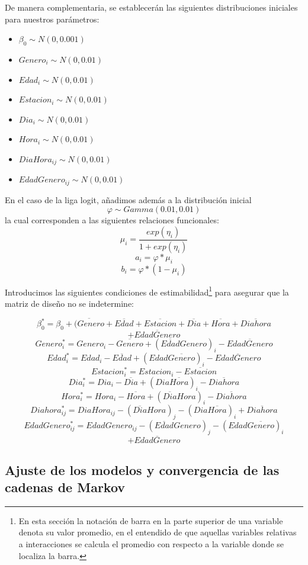 \documentclass[9pt,twocolumn,twoside]{ilcss}
\begin{document}
De manera complementaria, se establecerán las siguientes distribuciones iniciales para nuestros parámetros:
\begin{itemize}
	\item $\beta_0 \sim N(0,0.001)$
	\item $Genero_i \sim N(0,0.01)$
	\item $Edad_i \sim N(0,0.01)$
	\item $Estacion_i \sim N(0,0.01)$
	\item $Dia_i \sim N(0,0.01)$
	\item $Hora_i \sim N(0,0.01)$
	\item $DiaHora_{ij} \sim N(0,0.01)$
	\item $EdadGenero_{ij} \sim N(0,0.01)$
	
\end{itemize}
En el caso de la liga logit, añadimos además a la distribución inicial
$$\varphi \sim Gamma(0.01,0.01)$$
la cual corresponden a las siguientes relaciones funcionales:
$$\mu_i=\frac{exp(\eta_i)}{1+exp(\eta_i)}$$ 
        	$$a_i =\varphi*\mu_i$$
        $$b_i =\varphi*(1-\mu_i)$$
        
Introducimos las siguientes condiciones de estimabilidad\footnote{En esta sección la notación de barra en la parte superior de una variable denota su valor promedio, en el entendido de que aquellas variables relativas a interacciones se calcula el promedio con respecto a la variable donde se localiza la barra.} para asegurar que la matriz de diseño no se indetermine:

$$ \beta_0^* = \beta_0+\overline{(Genero}+\overline{Edad}+\overline{Estacion}+\overline{Dia}+\overline{Hora}+\overline{Diahora}$$
$$+\overline{EdadGenero}$$
$$Genero^*_{i} = Genero_{i}-\overline{Genero}+\left (\overline{Edad}Genero \right )_{i} -\overline{EdadGenero}$$
$$Edad^*_{i} = Edad_{i}-\overline{Edad}+\left ( Edad\overline{Genero} \right )_{i}-\overline{EdadGenero}$$
$$Estacion^*_{i} = Estacion_{i}-\overline{Estacion}$$
$$Dia^*_{i} = Dia_{i}-\overline{Dia} + \left ( Dia\overline{Hora} \right )_{i} -\overline{Diahora}$$
$$Hora^*_{i} = Hora_{i}-\overline{Hora}+\left (\overline{Dia}Hora  \right )_{i}-\overline{Diahora}$$
$$Diahora^*_{ij} = DiaHora_{ij}-\left (\overline{Dia}Hora  \right )_{j}-\left ( Dia\overline{Hora} \right )_{i} +\overline{Diahora}$$
$$EdadGenero^*_{ij}= EdadGenero_{ij}-(\overline{Edad}Genero)_{j}- \left ( Edad\overline{Genero} \right ) _{i}$$
$$+\overline{EdadGenero}$$

\subsection{Ajuste de los modelos y convergencia de las cadenas de Markov}
\end{document}
